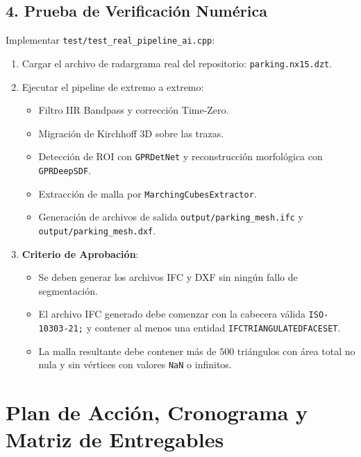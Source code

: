 \documentclass[11pt,a4paper]{article}
\begin{document}
\subsection{4. Prueba de Verificaci{\'o}n Num{\'e}rica}
Implementar \texttt{test/test\_real\_pipeline\_ai.cpp}:
\begin{enumerate}
    \item Cargar el archivo de radargrama real del repositorio: \texttt{parking.nx15.dzt}.
    \item Ejecutar el pipeline de extremo a extremo:
    \begin{itemize}
        \item Filtro IIR Bandpass y correcci{\'o}n Time-Zero.
        \item Migraci{\'o}n de Kirchhoff 3D sobre las trazas.
        \item Detecci{\'o}n de ROI con \texttt{GPRDetNet} y reconstrucci{\'o}n morfol{\'o}gica con \texttt{GPRDeepSDF}.
        \item Extracci{\'o}n de malla por \texttt{MarchingCubesExtractor}.
        \item Generaci{\'o}n de archivos de salida \texttt{output/parking\_mesh.ifc} y \texttt{output/parking\_mesh.dxf}.
    \end{itemize}
    \item \textbf{Criterio de Aprobaci{\'o}n}:
    \begin{itemize}
        \item Se deben generar los archivos IFC y DXF sin ning{\'u}n fallo de segmentaci{\'o}n.
        \item El archivo IFC generado debe comenzar con la cabecera v{\'a}lida \texttt{ISO-10303-21;} y contener al menos una entidad \texttt{IFCTRIANGULATEDFACESET}.
        \item La malla resultante debe contener m{\'a}s de $500$ tri{\'a}ngulos con {\'a}rea total no nula y sin v{\'e}rtices con valores \texttt{NaN} o infinitos.
    \end{itemize}
\end{enumerate}

\newpage

\section{Plan de Acci{\'o}n, Cronograma y Matriz de Entregables}
\end{document}
